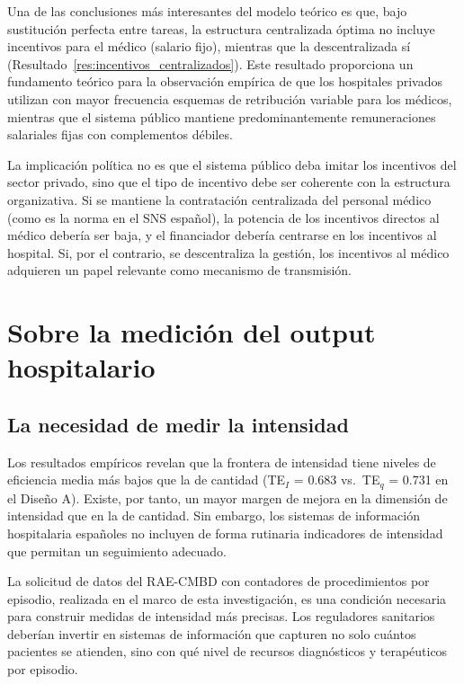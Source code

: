 \documentclass[12pt, a4paper, twoside, openright]{book}
\theoremstyle{plain}
\theoremstyle{definition}
\theoremstyle{remark}
\begin{document}
Una de las conclusiones más interesantes del modelo teórico es que, bajo sustitución perfecta entre tareas, la estructura centralizada óptima no incluye incentivos para el médico (salario fijo), mientras que la descentralizada sí (Resultado~\ref{res:incentivos_centralizados}). Este resultado proporciona un fundamento teórico para la observación empírica de que los hospitales privados utilizan con mayor frecuencia esquemas de retribución variable para los médicos, mientras que el sistema público mantiene predominantemente remuneraciones salariales fijas con complementos débiles.

La implicación política no es que el sistema público deba imitar los incentivos del sector privado, sino que el tipo de incentivo debe ser coherente con la estructura organizativa. Si se mantiene la contratación centralizada del personal médico (como es la norma en el SNS español), la potencia de los incentivos directos al médico debería ser baja, y el financiador debería centrarse en los incentivos al hospital. Si, por el contrario, se descentraliza la gestión, los incentivos al médico adquieren un papel relevante como mecanismo de transmisión.

\section{Sobre la medición del output hospitalario}

\subsection{La necesidad de medir la intensidad}

Los resultados empíricos revelan que la frontera de intensidad tiene niveles de eficiencia media más bajos que la de cantidad (TE$_I$ = 0.683 vs.\ TE$_q$ = 0.731 en el Diseño A). Existe, por tanto, un mayor margen de mejora en la dimensión de intensidad que en la de cantidad. Sin embargo, los sistemas de información hospitalaria españoles no incluyen de forma rutinaria indicadores de intensidad que permitan un seguimiento adecuado.

La solicitud de datos del RAE-CMBD con contadores de procedimientos por episodio, realizada en el marco de esta investigación, es una condición necesaria para construir medidas de intensidad más precisas. Los reguladores sanitarios deberían invertir en sistemas de información que capturen no solo cuántos pacientes se atienden, sino con qué nivel de recursos diagnósticos y terapéuticos por episodio.
\end{document}

